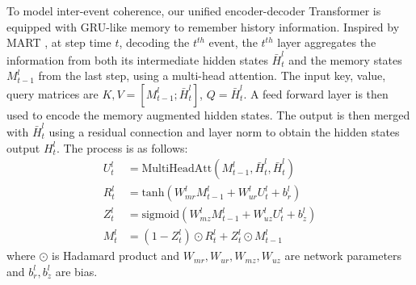 \documentclass{article}
\begin{document}
\vspace{-1mm}
To model inter-event coherence, our unified encoder-decoder Transformer is equipped with GRU-like memory to remember history information. Inspired by MART \cite{lei2020mart}, at step time $t$, decoding the $t^{th}$ event, the $t^{th}$ layer aggregates the information from both its intermediate hidden states $\bar{H}^l_t$ and the memory states $M_{t-1}^l$ from the last step, using a multi-head attention. The input key, value, query matrices are $K, V = [M_{t-1}^l; \bar{H}^l_t]$, $Q = \bar{H}^l_t$. A feed forward layer is then used to encode the memory augmented hidden states. The output is then merged with $\bar{H}^l_t$ using a residual connection and layer norm to obtain the hidden states output ${H}^l_t$. The process is as follows:
\vspace{-1mm}
\begin{equation}
\begin{split}
  U^l_t & = \text{MultiHeadAtt}(M_{t-1}^l, \bar{H}^l_t, \bar{H}^l_t) \\
  R^l_t & = \text{tanh}(W_{mr}^lM_{t-1}^l + W_{ur}^lU_{t}^l + b^l_r) \\
  Z^l_t & = \text{sigmoid}(W_{mz}^lM_{t-1}^l + W_{uz}^lU_{t}^l + b^l_z) \\
  M^l_t & = (1 - Z^l_t) \odot    R^l_t + Z^l_t \odot    M^l_{t-1}
\end{split}
\end{equation}
where $\odot$ is Hadamard product and $W_{mr}, W_{ur}, W_{mz}, W_{uz}$ are network parameters and $b^l_r, b^l_z$ are bias.
\vspace{-3.5mm}
\end{document}
